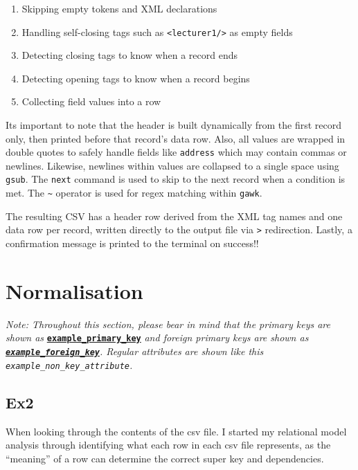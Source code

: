 \documentclass[12pt, a4paper]{report}
\begin{document}
\begin{enumerate} %
    \item Skipping empty tokens and XML declarations
    \item Handling self-closing tags such as \texttt{<lecturer1/>} as empty fields
    \item Detecting closing tags to know when a record ends
    \item Detecting opening tags to know when a record begins
    \item Collecting field values into a row
\end{enumerate}

Its important to note that the header is built dynamically from the first record only, then printed before that record's data row. Also, all values are wrapped in double quotes to safely handle fields like \texttt{address} which may contain commas or newlines. Likewise, newlines within values are collapsed to a single space using \texttt{gsub}. The \texttt{next} command \cite{opensource_next} is used to skip to the next record when a condition is met. The \texttt{\textasciitilde} operator \cite{gawk_man} is used for regex matching within \texttt{gawk}.

The resulting CSV has a header row derived from the XML tag names and one data row per record, written directly to the output file via \texttt{>} redirection. Lastly, a confirmation message is printed to the terminal on success!!

\section{Normalisation}

\textit{Note: Throughout this section, please bear in mind that the primary keys are shown as } \textnormal{\textbf{\underline{\texttt{example\_primary\_key}}}} \textit{ and foreign primary keys are shown as \textbf{\underline{\texttt{example\_foreign\_key}}}\textit{. Regular attributes are shown like this} \textnormal{\texttt{example\_non\_key\_attribute}.}}








\subsection{Ex2}

When looking through the contents of the csv file. I started my relational model analysis through identifying what each row in each csv file represents, as the ``meaning'' of a row can determine the correct super key and dependencies.
\end{document}
